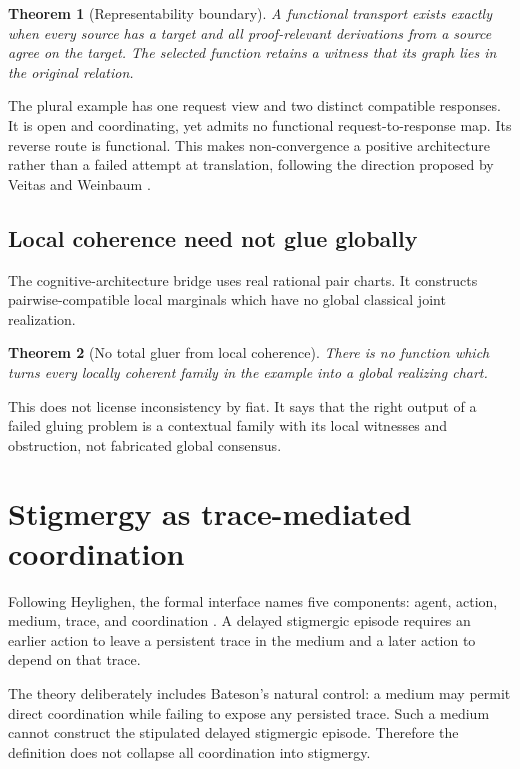 \documentclass[11pt]{article}
\newtheorem{theorem}{Theorem}[section]
\begin{document}
\begin{theorem}[Representability boundary]
A functional transport exists exactly when every source has a target and all
proof-relevant derivations from a source agree on the target.  The selected function
retains a witness that its graph lies in the original relation.
\end{theorem}

The plural example has one request view and two distinct compatible responses.  It is
open and coordinating, yet admits no functional request-to-response map.  Its reverse
route is functional.  This makes non-convergence a positive architecture rather than
a failed attempt at translation, following the direction proposed by Veitas and
Weinbaum \cite{veitasweinbaum2014,veitasweinbaum2015}.

\subsection{Local coherence need not glue globally}

The cognitive-architecture bridge uses real rational pair charts.  It constructs
pairwise-compatible local marginals which have no global classical joint realization.

\begin{theorem}[No total gluer from local coherence]
There is no function which turns every locally coherent family in the example into a
global realizing chart.
\end{theorem}

This does not license inconsistency by fiat.  It says that the right output of a
failed gluing problem is a contextual family with its local witnesses and obstruction,
not fabricated global consensus.

\section{Stigmergy as trace-mediated coordination}

Following Heylighen, the formal interface names five components: agent, action,
medium, trace, and coordination \cite{heylighen2015}.  A delayed stigmergic episode
requires an earlier action to leave a persistent trace in the medium and a later
action to depend on that trace.

The theory deliberately includes Bateson's natural control: a medium may permit
direct coordination while failing to expose any persisted trace.  Such a medium
cannot construct the stipulated delayed stigmergic episode.  Therefore the definition
does not collapse all coordination into stigmergy.
\end{document}
